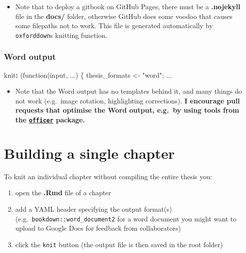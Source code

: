 \documentclass[a4paper, nobind]{templates/ociamthesis}
\providecommand{\tightlist}{%
  \setlength{\itemsep}{0pt}\setlength{\parskip}{0pt}}
\newenvironment{Shaded}{\begin{snugshade}}{\end{snugshade}}
\newcommand{\AttributeTok}[1]{\textcolor[rgb]{0.77,0.63,0.00}{#1}}
\newcommand{\FunctionTok}[1]{\textcolor[rgb]{0.00,0.00,0.00}{#1}}
\newcommand{\KeywordTok}[1]{\textcolor[rgb]{0.13,0.29,0.53}{\textbf{#1}}}
\renewenvironment{Shaded}
{
  \vspace{10pt}%
  \begin{snugshade}%
}{%
  \end{snugshade}%
  \vspace{8pt}%
}
\begin{document}
\begin{itemize}
\tightlist
\item
  Note that to deploy a gitbook on GitHub Pages, there must be a \textbf{.nojekyll} file in the \textbf{docs/} folder, otherwise GitHub does some voodoo that causes some filepaths not to work. This file is generated automatically by \texttt{oxforddown}s knitting function.
\end{itemize}

\hypertarget{word-output}{%
\subsubsection{Word output}\label{word-output}}

\begin{Shaded}
\begin{Highlighting}[]
\FunctionTok{knit}\KeywordTok{:}\AttributeTok{ (function(input, ...) \{}
\AttributeTok{    thesis\_formats \textless{}{-} "word";}
\AttributeTok{    ...}
\end{Highlighting}
\end{Shaded}

\begin{itemize}
\tightlist
\item
  Note that the Word output has no templates behind it, and many things do not work (e.g.~image rotation, highlighting corrections). \textbf{I encourage pull requests that optimise the Word output, e.g.~by using tools from the \href{https://github.com/davidgohel/officer}{\texttt{officer}} package.}
\end{itemize}

\hypertarget{building-a-single-chapter}{%
\section{Building a single chapter}\label{building-a-single-chapter}}

To knit an individual chapter without compiling the entire thesis you:

\begin{enumerate}
\def\labelenumi{\arabic{enumi}.}
\tightlist
\item
  open the \textbf{.Rmd} file of a chapter
\item
  add a YAML header specifying the output format(s) (e.g.~\texttt{bookdown::word\_document2} for a word document you might want to upload to Google Docs for feedback from collaborators)
\item
  click the \texttt{knit} button (the output file is then saved in the root folder)
\end{enumerate}
\end{document}
